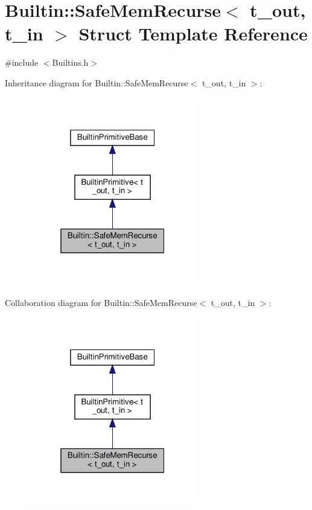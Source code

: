 \hypertarget{struct_builtin_1_1_safe_mem_recurse}{}\section{Builtin\+:\+:Safe\+Mem\+Recurse$<$ t\+\_\+out, t\+\_\+in $>$ Struct Template Reference}
\label{struct_builtin_1_1_safe_mem_recurse}


{\ttfamily \#include $<$Builtins.\+h$>$}



Inheritance diagram for Builtin\+:\+:Safe\+Mem\+Recurse$<$ t\+\_\+out, t\+\_\+in $>$\+:\nopagebreak
\begin{figure}[H]
\begin{center}
\leavevmode
\includegraphics[width=208pt]{struct_builtin_1_1_safe_mem_recurse__inherit__graph}
\end{center}
\end{figure}


Collaboration diagram for Builtin\+:\+:Safe\+Mem\+Recurse$<$ t\+\_\+out, t\+\_\+in $>$\+:\nopagebreak
\begin{figure}[H]
\begin{center}
\leavevmode
\includegraphics[width=208pt]{struct_builtin_1_1_safe_mem_recurse__coll__graph}
\end{center}
\end{figure}
